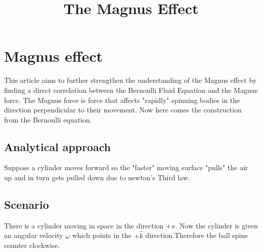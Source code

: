 \documentclass[a4paper]{article}
\title{The Magnus Effect}
\begin{document}
\maketitle
    
\section{Magnus effect }
This article aims to further strengthen the understanding of the Magnus effect by finding a direct correlation between the Bernoulli Fluid Equation and the Magnus force. The Magnus force is force that affects "rapidly" spinning bodies in the direction perpendicular to their movement. Now here comes the construction from the Bernoulli equation.
\subsection{Analytical approach}
Suppose a cylinder moves forward so the "faster" moving surface "pulls" the air up and in turn gets pulled down due to newton's Third law.
\subsection{Scenario}
There is a cylinder moving in space in the direction $+\hat{x}$. Now the cylinder is given an angular velocity $\omega$ which points in the $+\hat{k}$ direction.Therefore the ball spins counter clockwise.
\end{document}
